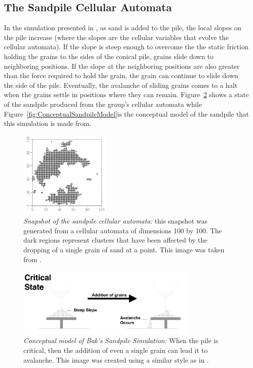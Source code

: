\documentclass{book}
\begin{document}
\subsection{The Sandpile Cellular Automata}
In the simulation presented in \cite{OGperBak1987}, as sand is added to the pile, the local slopes on the pile increase (where the slopes are the cellular variables that evolve the cellular automata). If the slope is steep enough to overcome the the static friction holding the grains to the sides of the conical pile, grains slide down to neighboring positions. If the slope at the neighboring positions are also greater than the force required to hold the grain,  the grain can continue to slide down the side of the pile.  Eventually, the avalanche of sliding grains comes to a halt when the grains settle in positions where they can remain. Figure~\ref{fig:perBak_cellular} shows a state of the sandpile produced from the group's cellular automata while Figure~\ref{fig:ConceptualSandpileModel}is the conceptual model of the sandpile that this simulation is made from. 
\begin{figure}[h]
	\centering
	\includegraphics[width=0.4\textwidth]{Figures/Intro/SandPileFigs/perBak_cellular}
	\caption[Snapshot of the sandpile cellular automata]{
		\textit{Snapshot of the sandpile cellular automata:} this snapshot was generated from a cellular automata of dimensions 100 by 100. The dark regions represent clusters that have been affected by the dropping of a single grain of sand at a point.  This image was taken from \cite{OGperBak1987}.}
	\label{fig:perBak_cellular}
\end{figure}
\begin{figure}[h]
	\centering
	\includegraphics[width=0.8\textwidth]{Figures/Intro/SandPileFigs/theoreticalModel}
	\caption[Conceptual model of Bak's Sandpile Simulation]{
		\textit{Conceptual model of Bak's Sandpile Simulation:} When the pile is critical, then the addition of even a single grain can lead it to avalanche. This image was created using a similar style as in \cite{IMGSandPile}.}
	\label{fig:perBak_cellular}
\end{figure}
\end{document}
